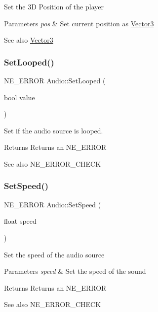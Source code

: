 Set the 3D Position of the player 
\begin{DoxyParams}{Parameters}
{\em pos} & Set current position as \mbox{\hyperlink{struct_vector3}{Vector3}} \\
\hline
\end{DoxyParams}
\begin{DoxySeeAlso}{See also}
\mbox{\hyperlink{struct_vector3}{Vector3}} 
\end{DoxySeeAlso}
\mbox{\label{class_audio_a62ef89ef3f72dda0a2aece1784c26859}} 
\subsubsection{\texorpdfstring{SetLooped()}{SetLooped()}}
{\footnotesize\ttfamily N\+E\+\_\+\+E\+R\+R\+OR Audio\+::\+Set\+Looped (\begin{DoxyParamCaption}\item[{bool}]{value }\end{DoxyParamCaption})}



Set if the audio source is looped. 

\begin{DoxyReturn}{Returns}
Returns an N\+E\+\_\+\+E\+R\+R\+OR 
\end{DoxyReturn}
\begin{DoxySeeAlso}{See also}
N\+E\+\_\+\+E\+R\+R\+O\+R\+\_\+\+C\+H\+E\+CK 
\end{DoxySeeAlso}
\mbox{\label{class_audio_acf14619b8950e8c77494a8b19a9b2a89}} 
\subsubsection{\texorpdfstring{SetSpeed()}{SetSpeed()}}
{\footnotesize\ttfamily N\+E\+\_\+\+E\+R\+R\+OR Audio\+::\+Set\+Speed (\begin{DoxyParamCaption}\item[{float}]{speed }\end{DoxyParamCaption})}

Set the speed of the audio source 
\begin{DoxyParams}{Parameters}
{\em speed} & Set the speed of the sound \\
\hline
\end{DoxyParams}
\begin{DoxyReturn}{Returns}
Returns an N\+E\+\_\+\+E\+R\+R\+OR 
\end{DoxyReturn}
\begin{DoxySeeAlso}{See also}
N\+E\+\_\+\+E\+R\+R\+O\+R\+\_\+\+C\+H\+E\+CK 
\end{DoxySeeAlso}
\mbox{\label{class_audio_adf1cb46f65decf2c8101dd0461040953}} 
